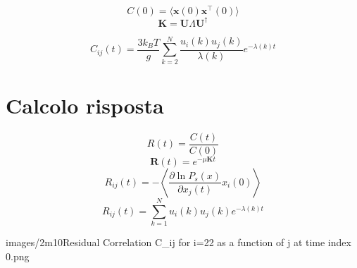 \documentclass{article}
\begin{document}
\begin{equation}
    C(0) = \langle \mathbf{x}(0) \mathbf{x}^\top(0) \rangle
    \end{equation}
\begin{equation}
    \mathbf{K} = \mathbf{U} \Lambda \mathbf{U}^\dagger
    \end{equation}
        
\begin{equation}
    C_{ij}(t) = \frac{3 k_B T}{g} \sum_{k=2}^{N} \frac{u_i(k) u_j(k)}{\lambda(k)} e^{-\lambda(k) t}
    \end{equation}
        
\section{Calcolo risposta}
\begin{equation}
    R(t) = \frac{C(t)}{C(0)}
    \end{equation}
\begin{equation}
    \mathbf{R}(t) = e^{-\mu \mathbf{K} t}
    \end{equation}
\begin{equation}
    R_{ij}(t) = - \left\langle \frac{\partial \ln P_s(x)}{\partial x_j(t)} x_i(0) \right\rangle
    \end{equation}
\begin{equation}
    R_{ij}(t) = \sum_{k=1}^{N} u_i(k) u_j(k) e^{-\lambda(k) t}
    \end{equation}






images/2m10Residual Correlation C_ij for i=22 as a function of j at time index 0.png
\end{document}
